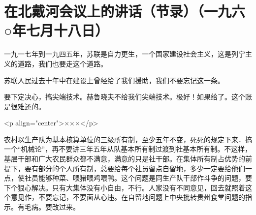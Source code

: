 \section[在北戴河会议上的讲话（节录）（一九六○年七月十八日）]{在北戴河会议上的讲话（节录）（一九六○年七月十八日）}


一九一七年到一九四五年，苏联是自力更生，一个国家建设社会主义，这是列宁主义的道路，我们也要走这个道路。

苏联人民过去十年中在建设上曾经给了我们援助，我们不要忘记这一条。

要下定决心，搞尖端技术。赫鲁晓夫不给我们尖端技术。极好！如果给了。这个账是很难还的。

<p align="center">×××</p>

农村以生产队为基本核算单位的三级所有制，至少五年不变，死死的规定下来．搞一个“机械论”，再不要讲三年五年从队基本所有制过渡到社基本所有制。不这样，基层干部和广大农民群众都不满意，满意的只是社干部。在集体所有制占优势的前提下，要有部分的个人所有制，总要给每个社员留点自留地，多少一定要给他们一点，使社员能够种菜、喂猪喂鸡喂鸭。这个问题是同生产队干部作斗争的问题，要下个狠心解决。只有大集体没有小自由，不行。人家没有不同意见，回去就照着这个意见作，不要忘记，不要面从心违。在自留地问题上中央批转贵州食堂问题的指示。有毛病。要改过来。



